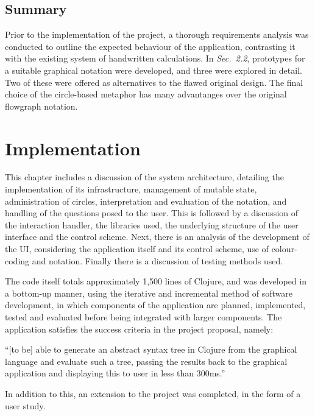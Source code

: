 \documentclass[12pt,twoside,notitlepage,xetex]{report}
\begin{document}
\section{Summary}

Prior to the implementation of the project, a thorough requirements analysis was conducted to outline the expected behaviour of the application, contrasting it with the existing system of handwritten calculations.  In \emph{Sec.~2.2}, prototypes for a suitable graphical notation were developed, and three were explored in detail.  Two of these were offered as alternatives to the flawed original design.  The final choice of the circle-based metaphor has many advantanges over the original flowgraph notation.

\cleardoublepage
\chapter{Implementation}

This chapter includes a discussion of the system architecture, detailing the implementation of its infrastructure, management of mutable state, administration of circles, interpretation and evaluation of the notation, and handling of the questions posed to the user.  This is followed by a discussion of the interaction handler, the libraries used, the underlying structure of the user interface and the control scheme.  Next, there is an analysis of the development of the UI, considering the application itself and its control scheme, use of colour-coding and notation.  Finally there is a discussion of testing methods used.

The code itself totals approximately 1,500 lines of Clojure, and was developed in a bottom-up manner, using the iterative and incremental method of software development, in which components of the application are planned, implemented, tested and evaluated before being integrated with larger components.  The application satisfies the success criteria in the project proposal, namely:
\begin{center}
\parbox[c]{\textwidth-2cm}{
\small
``[to be] able to generate an abstract syntax tree in Clojure from the graphical language and evaluate such a tree, passing the results back to the graphical application and displaying this to user in less than 300ms.''
}
\end{center}
In addition to this, an extension to the project was completed, in the form of a user study.
\end{document}
